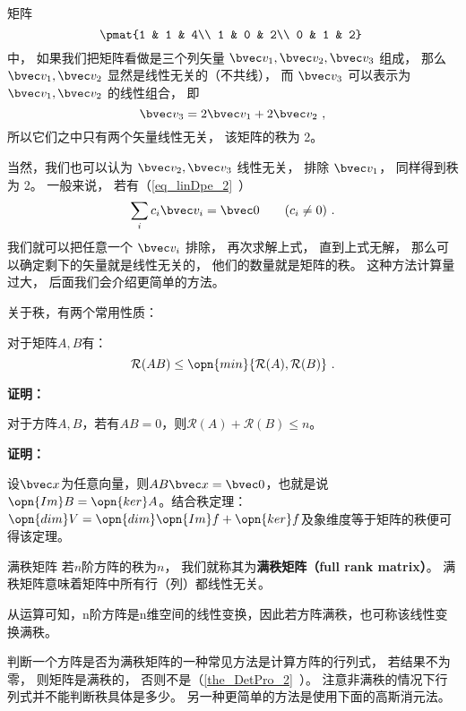 \begin{example}{}
矩阵
\begin{equation}\label{eq_MatRnk_1}
\pmat{1 & 1 & 4\\ 1 & 0 & 2\\ 0 & 1 & 2}~
\end{equation}
中， 如果我们把矩阵看做是三个列矢量 $\bvec v_1, \bvec v_2, \bvec v_3$ 组成， 那么 $\bvec v_1, \bvec v_2$ 显然是线性无关的（不共线）， 而 $\bvec v_3$ 可以表示为 $\bvec v_1, \bvec v_2$ 的线性组合， 即
\begin{equation}
\bvec v_3 = 2\bvec v_1 + 2\bvec v_2~,
\end{equation}
所以它们之中只有两个矢量线性无关， 该矩阵的秩为 2。

当然，我们也可以认为 $\bvec v_2, \bvec v_3$ 线性无关， 排除 $\bvec v_1$， 同样得到秩为 2。 一般来说， 若有（\autoref{eq_linDpe_2}~）
\begin{equation}
\sum_i c_i \bvec v_i = \bvec 0 \qquad (c_i \ne 0)~.
\end{equation}
我们就可以把任意一个 $\bvec v_i$ 排除， 再次求解上式， 直到上式无解， 那么可以确定剩下的矢量就是线性无关的， 他们的数量就是矩阵的秩。 这种方法计算量过大， 后面我们会介绍更简单的方法。
\end{example}
关于秩，有两个常用性质：
\begin{theorem}{}
对于矩阵$A,B$有：
\begin{equation}
\mathcal R(AB)\le\opn{min}\{\mathcal R(A),\mathcal R(B)\}~.
\end{equation}
\end{theorem}
\textbf{证明：}

\begin{theorem}{}
对于方阵$A,B$，若有$AB=0$，则$\mathcal R(A)+\mathcal R(B)\le n$。
\end{theorem}
\textbf{证明：}

设$\bvec x$为任意向量，则$AB\bvec x=\bvec 0$，也就是说$\opn{Im}B=\opn{ker}A$。结合秩定理：$\opn{dim}V=\opn{dim}\opn{Im}f+\opn{ker}f$及象维度等于矩阵的秩便可得该定理。

\begin{definition}{满秩矩阵}
若$n$阶方阵的秩为$n$， 我们就称其为\textbf{满秩矩阵（full rank matrix）}。 满秩矩阵意味着矩阵中所有行（列）都线性无关。
\end{definition}
从运算可知，n阶方阵是n维空间的线性变换，因此若方阵满秩，也可称该线性变换满秩。

判断一个方阵是否为满秩矩阵的一种常见方法是计算方阵的行列式， 若结果不为零， 则矩阵是满秩的， 否则不是（\autoref{the_DetPro_2}~）。 注意非满秩的情况下行列式并不能判断秩具体是多少。 另一种更简单的方法是使用下面的高斯消元法。

